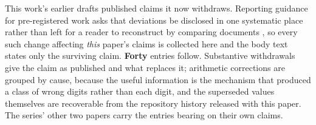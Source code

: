 \documentclass[11pt]{article}
\begin{document}
This work's earlier drafts published claims it now withdraws. Reporting guidance for pre-registered
work asks that deviations be disclosed in
one systematic place rather than left for a reader to reconstruct by comparing documents
\citep{willroth2024bestlaid}, so every such change affecting \emph{this} paper's claims is
collected here and the body text states only the surviving claim. \textbf{Forty} entries follow.
Substantive withdrawals give the claim as
published and what replaces it; arithmetic corrections are grouped by cause, because the useful
information is the mechanism that produced a class of wrong digits rather than each digit, and the
superseded values themselves are recoverable from the repository history released with this paper.
The series' other two papers carry the entries bearing on their own claims.
\end{document}
